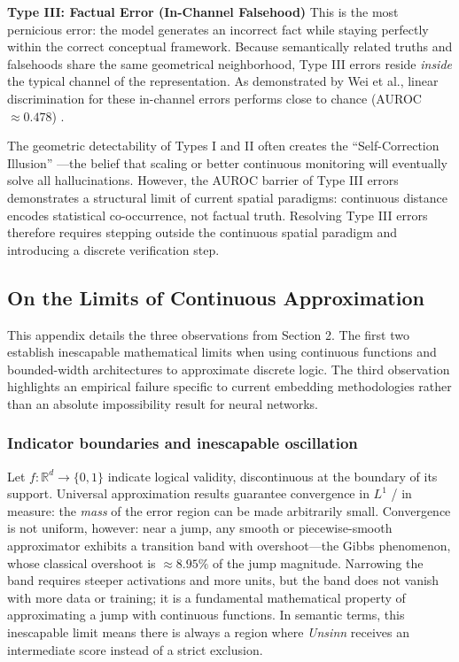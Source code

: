 \documentclass{article}
\begin{document}
\textbf{Type III: Factual Error (In-Channel Falsehood)} This is the most
pernicious error: the model generates an incorrect fact while staying
perfectly within the correct conceptual framework. Because semantically
related truths and falsehoods share the same geometrical neighborhood,
Type III errors reside \emph{inside} the typical channel of the
representation. As demonstrated by Wei et al., linear discrimination for
these in-channel errors performs close to chance (AUROC
\(\approx 0.478\)) \citep{wei2024measuring}.

The geometric detectability of Types I and II often creates the
``Self-Correction Illusion'' \citep{symcode2025}---the belief that
scaling or better continuous monitoring will eventually solve all
hallucinations. However, the AUROC barrier of Type III errors
demonstrates a structural limit of current spatial paradigms: continuous
distance encodes statistical co-occurrence, not factual truth. Resolving
Type III errors therefore requires stepping outside the continuous
spatial paradigm and introducing a discrete verification step.

\hypertarget{on-the-limits-of-continuous-approximation}{%
\subsection{\texorpdfstring{On the Limits of Continuous Approximation
\label{app:continuous}}{On the Limits of Continuous Approximation }}\label{on-the-limits-of-continuous-approximation}}

This appendix details the three observations from Section 2. The first
two establish inescapable mathematical limits when using continuous
functions and bounded-width architectures to approximate discrete logic.
The third observation highlights an empirical failure specific to
current embedding methodologies rather than an absolute impossibility
result for neural networks.

\hypertarget{indicator-boundaries-and-inescapable-oscillation}{%
\subsubsection{Indicator boundaries and inescapable
oscillation}\label{indicator-boundaries-and-inescapable-oscillation}}

Let \(f: \mathbb{R}^d \to \{0,1\}\) indicate logical validity,
discontinuous at the boundary of its support. Universal approximation
results \citep{hornik1991approximation} guarantee convergence in \(L^1\)
/ in measure: the \emph{mass} of the error region can be made
arbitrarily small. Convergence is not uniform, however: near a jump, any
smooth or piecewise-smooth approximator exhibits a transition band with
overshoot---the Gibbs phenomenon, whose classical overshoot is
\(\approx 8.95\%\) of the jump magnitude. Narrowing the band requires
steeper activations and more units, but the band does not vanish with
more data or training; it is a fundamental mathematical property of
approximating a jump with continuous functions. In semantic terms, this
inescapable limit means there is always a region where \emph{Unsinn}
receives an intermediate score instead of a strict exclusion.
\end{document}

